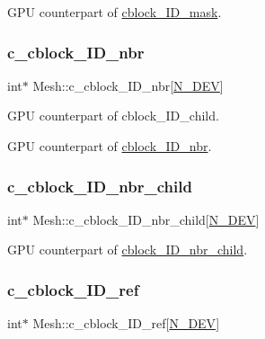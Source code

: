 G\+PU counterpart of \hyperlink{classMesh_ac9cda8833eb008b6a99988e18fd09960}{cblock\+\_\+\+I\+D\+\_\+mask}. 

\mbox{\label{classMesh_a73ae287026f89ed3a1e8fc9ca22958b0}} 
\subsubsection{\texorpdfstring{c\+\_\+cblock\+\_\+\+I\+D\+\_\+nbr}{c\_cblock\_ID\_nbr}}
{\footnotesize\ttfamily int$\ast$ Mesh\+::c\+\_\+cblock\+\_\+\+I\+D\+\_\+nbr\mbox{[}\hyperlink{cppspec_8h_a2b674dab7a14f1bf32b48b7fda5022dc}{N\+\_\+\+D\+EV}\mbox{]}}



G\+PU counterpart of cblock\+\_\+\+I\+D\+\_\+child. 

G\+PU counterpart of \hyperlink{classMesh_a81d8e99aa31cb83a0f58805ef1f5ca86}{cblock\+\_\+\+I\+D\+\_\+nbr}. \mbox{\label{classMesh_abecfa6150231142125696a3a4db0d9b2}} 
\subsubsection{\texorpdfstring{c\+\_\+cblock\+\_\+\+I\+D\+\_\+nbr\+\_\+child}{c\_cblock\_ID\_nbr\_child}}
{\footnotesize\ttfamily int$\ast$ Mesh\+::c\+\_\+cblock\+\_\+\+I\+D\+\_\+nbr\+\_\+child\mbox{[}\hyperlink{cppspec_8h_a2b674dab7a14f1bf32b48b7fda5022dc}{N\+\_\+\+D\+EV}\mbox{]}}



G\+PU counterpart of \hyperlink{classMesh_abb8b2b9b54bc8d342bd5db602063f133}{cblock\+\_\+\+I\+D\+\_\+nbr\+\_\+child}. 

\mbox{\label{classMesh_a061a8950733957c307b6b352c19120b2}} 
\subsubsection{\texorpdfstring{c\+\_\+cblock\+\_\+\+I\+D\+\_\+ref}{c\_cblock\_ID\_ref}}
{\footnotesize\ttfamily int$\ast$ Mesh\+::c\+\_\+cblock\+\_\+\+I\+D\+\_\+ref\mbox{[}\hyperlink{cppspec_8h_a2b674dab7a14f1bf32b48b7fda5022dc}{N\+\_\+\+D\+EV}\mbox{]}}



